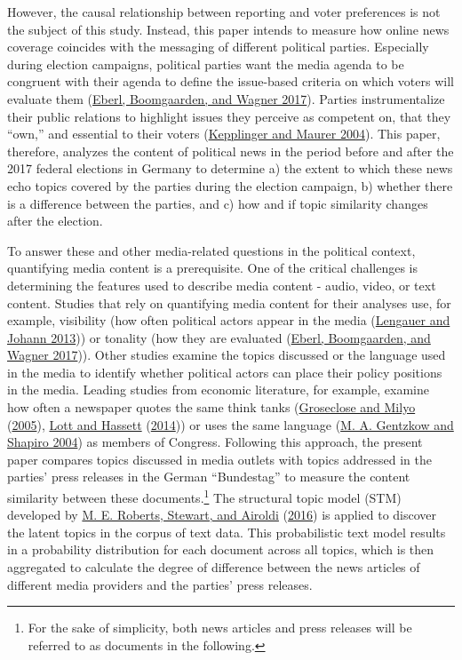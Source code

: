 \documentclass[
  12pt,
]{article}
\begin{document}
However, the causal relationship between reporting and voter preferences
is not the subject of this study. Instead, this paper intends to measure
how online news coverage coincides with the messaging of different
political parties. Especially during election campaigns, political
parties want the media agenda to be congruent with their agenda to
define the issue-based criteria on which voters will evaluate them
(\protect\hyperlink{ref-eberl_one_2017}{Eberl, Boomgaarden, and Wagner
2017}). Parties instrumentalize their public relations to highlight
issues they perceive as competent on, that they ``own,'' and essential
to their voters
(\protect\hyperlink{ref-kepplinger_einfluss_2004}{Kepplinger and Maurer
2004}). This paper, therefore, analyzes the content of political news in
the period before and after the 2017 federal elections in Germany to
determine a) the extent to which these news echo topics covered by the
parties during the election campaign, b) whether there is a difference
between the parties, and c) how and if topic similarity changes after
the election.

To answer these and other media-related questions in the political
context, quantifying media content is a prerequisite. One of the
critical challenges is determining the features used to describe media
content - audio, video, or text content. Studies that rely on
quantifying media content for their analyses use, for example,
visibility (how often political actors appear in the media
(\protect\hyperlink{ref-lengauer_candidate_2013}{Lengauer and Johann
2013})) or tonality (how they are evaluated
(\protect\hyperlink{ref-eberl_one_2017}{Eberl, Boomgaarden, and Wagner
2017})). Other studies examine the topics discussed or the language used
in the media to identify whether political actors can place their policy
positions in the media. Leading studies from economic literature, for
example, examine how often a newspaper quotes the same think tanks
(\protect\hyperlink{ref-groseclose_measure_2005}{Groseclose and Milyo}
(\protect\hyperlink{ref-groseclose_measure_2005}{2005}),
\protect\hyperlink{ref-lott_is_2014}{Lott and Hassett}
(\protect\hyperlink{ref-lott_is_2014}{2014})) or uses the same language
(\protect\hyperlink{ref-gentzkow_media_2004}{M. A. Gentzkow and Shapiro
2004}) as members of Congress. Following this approach, the present
paper compares topics discussed in media outlets with topics addressed
in the parties' press releases in the German ``Bundestag'' to measure
the content similarity between these documents.\footnote{For the sake of
  simplicity, both news articles and press releases will be referred to
  as documents in the following.} The structural topic model (STM)
developed by \protect\hyperlink{ref-roberts_model_2016}{M. E. Roberts,
Stewart, and Airoldi} (\protect\hyperlink{ref-roberts_model_2016}{2016})
is applied to discover the latent topics in the corpus of text data.
This probabilistic text model results in a probability distribution for
each document across all topics, which is then aggregated to calculate
the degree of difference between the news articles of different media
providers and the parties' press releases.
\end{document}
